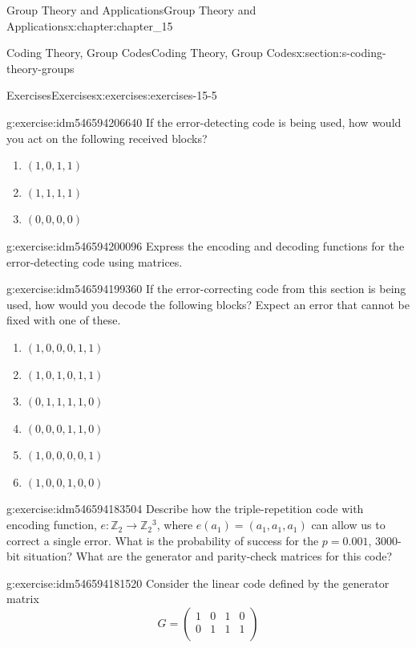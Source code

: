 \documentclass[oneside,10pt,]{book}
\numberwithin{equation}{section}
\begin{document}
\begin{chapterptx}{Group Theory and Applications}{}{Group Theory and Applications}{}{}{x:chapter:chapter_15}
\begin{sectionptx}{Coding Theory, Group Codes}{}{Coding Theory, Group Codes}{}{}{x:section:s-coding-theory-groups}
\begin{exercises-subsection}{Exercises}{}{Exercises}{}{}{x:exercises:exercises-15-5}
\begin{divisionexercise}{1}{}{}{g:exercise:idm546594206640}
If the error-detecting code is being used, how would you act on the following received blocks?%
\begin{enumerate}[label=(\alph*)]
\item{}\((1, 0, 1, 1)\)%
\item{}\((1, 1, 1, 1)\)%
\item{}\((0, 0, 0, 0)\)%
\end{enumerate}
%
\end{divisionexercise}%
\begin{divisionexercise}{2}{}{}{g:exercise:idm546594200096}%
Express the encoding and decoding functions for the error-detecting code using matrices.%
\end{divisionexercise}%
\begin{divisionexercise}{3}{}{}{g:exercise:idm546594199360}%
If the error-correcting code from this section is being used, how would you decode the following blocks? Expect an error that cannot be fixed with one of these.%
\begin{enumerate}[label=(\alph*)]
\item{}\((1,0,0,0,1,1)\)%
\item{}\((1,0,1,0,1,1)\)%
\item{}\((0,1,1,1,1,0)\)%
\item{}\((0,0,0,1,1,0)\)%
\item{}\((1,0,0,0,0,1)\)%
\item{}\((1,0,0,1,0,0)\)%
\end{enumerate}
%
\end{divisionexercise}%
\begin{divisionexercise}{4}{}{}{g:exercise:idm546594183504}%
Describe how the triple-repetition code with encoding function, \(e:\mathbb{Z}_2\to \mathbb{Z}_2{}^3\), where \(e\left(a_1\right) = \left(a_1,a_1,a_1\right)\) can allow us to correct a single error. What is the probability of success for the \(p = 0.001\), 3000-bit situation?  What are the generator and parity-check matrices for this code?%
\end{divisionexercise}%
\begin{divisionexercise}{5}{}{}{g:exercise:idm546594181520}%
Consider the  linear code defined by the generator matrix%
\begin{equation*}
G=\left(
\begin{array}{cccc}
1 & 0 & 1 & 0 \\
0 & 1 & 1 & 1 \\
\end{array}
\right)
\end{equation*}

\end{divisionexercise}
\end{exercises-subsection}
\end{sectionptx}
\end{chapterptx}
\end{document}
